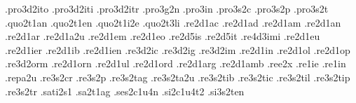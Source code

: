 {.pro3d2ito  .pro3d2iti .pro3d2itr %
.pro3g2n                          %
.pro3in                           %
.pro3s2c                          %
.pro3s2p                          %
.pro3s2t                          %
.quo2t1an                         %
.quo2t1en                         %
.quo2t1i2e             %
.quo2t3li                         %
.re2d1ac                          %
.re2d1ad                          %
.re2d1am                          %
.re2d1an                          %
.re2d1ar                          %
.re2d1a2u                         %
.re2d1em                          %
.re2d1eo .re2d5is .re2d5it  
.re4d3imi .re2d1eu .re2d1ier 
.re2d1ib .re2d1ien                %
.re3d2ic                          %
.re3d2ig                          %
.re3d2im                          %
.re2d1in                          %
.re2d1ol                          %
.re2d1op                          %
.re3d2orm                         %
.re2d1orn                         %
.re2d1ul                          %
.re2d1ord                         %
.re2d1arg                         %
.re2d1amb                         %
.ree2x                            %
.re1ie                            %
.re1in                            %
.repa2u                           %
.re3s2cr                          %
.re3s2p                           %
.re3s2tag                         %
.re3s2ta2u                        %
.re3s2tib                         %
.re3s2tic                         %
.re3s2til                         %
.re3s2tip                         %
.re3s2tr                          %
.sati2s1                          %
.sa2t1ag                          %
.ses2c1u4n                         %
.si2c1u4t2                        %
.si3s2ten                         %
}
